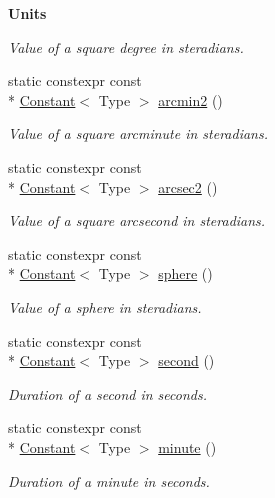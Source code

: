 \begin{Indent}{\bf Units}
\begin{DoxyCompactItemize}
\begin{DoxyCompactList}\small\item\em Value of a square degree in steradians. \end{DoxyCompactList}\item 
static constexpr const \\*
\hyperlink{exceptionmagrathea_1_1Constant}{Constant}$<$ Type $>$ \hyperlink{exceptionmagrathea_1_1Constants_aa91aaa77f91f0faf994ce69def04c546}{arcmin2} ()
\begin{DoxyCompactList}\small\item\em Value of a square arcminute in steradians. \end{DoxyCompactList}\item 
static constexpr const \\*
\hyperlink{exceptionmagrathea_1_1Constant}{Constant}$<$ Type $>$ \hyperlink{exceptionmagrathea_1_1Constants_aa16c32fe887144baa4d95393d579875c}{arcsec2} ()
\begin{DoxyCompactList}\small\item\em Value of a square arcsecond in steradians. \end{DoxyCompactList}\item 
static constexpr const \\*
\hyperlink{exceptionmagrathea_1_1Constant}{Constant}$<$ Type $>$ \hyperlink{exceptionmagrathea_1_1Constants_a6d48baeed63328945ab7de06ec19da50}{sphere} ()
\begin{DoxyCompactList}\small\item\em Value of a sphere in steradians. \end{DoxyCompactList}\item 
static constexpr const \\*
\hyperlink{exceptionmagrathea_1_1Constant}{Constant}$<$ Type $>$ \hyperlink{exceptionmagrathea_1_1Constants_af516aae12a07996cd2442164b2527d92}{second} ()
\begin{DoxyCompactList}\small\item\em Duration of a second in seconds. \end{DoxyCompactList}\item 
static constexpr const \\*
\hyperlink{exceptionmagrathea_1_1Constant}{Constant}$<$ Type $>$ \hyperlink{exceptionmagrathea_1_1Constants_aacccaf8ff88ce827a7c0e00774a2aab6}{minute} ()
\begin{DoxyCompactList}\small\item\em Duration of a minute in seconds. \end{DoxyCompactList}\item 

\end{DoxyCompactItemize}
\end{Indent}
